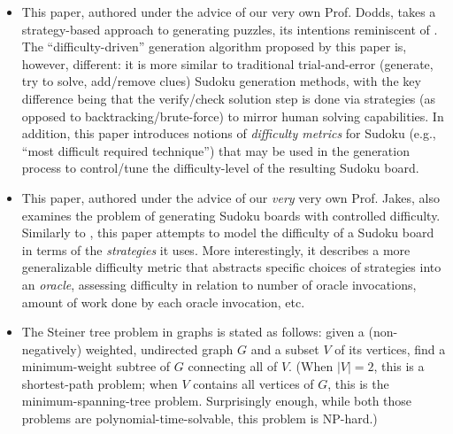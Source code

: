 \documentclass{extarticle}
\begin{document}
\begin{itemize}
  \item {}

    \begin{annotation}
      This paper, authored under the advice of our very own Prof. Dodds, takes
      a strategy-based approach to generating puzzles, its intentions
      reminiscent of \textcite{strategy-solvable-sudoku}.  The
      ``difficulty-driven'' generation algorithm proposed by this paper is,
      however, different: it is more similar to traditional trial-and-error
      (generate, try to solve, add/remove clues) Sudoku generation methods,
      with the key difference being that the verify/check solution step is done
      via strategies (as opposed to backtracking/brute-force) to mirror human
      solving capabilities.  In addition, this paper introduces notions of
      \emph{difficulty metrics} for Sudoku (e.g., ``most difficult required
      technique'') that may be used in the generation process to control/tune
      the difficulty-level of the resulting Sudoku board.
    \end{annotation}

  \item {}

    \begin{annotation}
      This paper, authored under the advice of our \emph{very} very own Prof.
      Jakes, also examines the problem of generating Sudoku boards with
      controlled difficulty.  Similarly to \textcite{difficulty-driven-sudoku},
      this paper attempts to model the difficulty of a Sudoku board in terms of
      the \emph{strategies} it uses.  More interestingly, it describes a more
      generalizable difficulty metric that abstracts specific choices of
      strategies into an \emph{oracle}, assessing difficulty in relation to
      number of oracle invocations, amount of work done by each oracle
      invocation, etc.
    \end{annotation}

  \item {}

    \begin{annotation}
      The Steiner tree problem in graphs is stated as follows: given a
      (non-negatively) weighted, undirected graph \(G\) and a subset \(V\) of
      its vertices, find a minimum-weight subtree of \(G\) connecting all of
      \(V\). (When \(\lvert V \rvert = 2\), this is a shortest-path problem;
      when \(V\) contains all vertices of \(G\), this is the
      minimum-spanning-tree problem. Surprisingly enough, while both those
      problems are polynomial-time-solvable, this problem is NP-hard.)


\end{annotation}
\end{itemize}
\end{document}
